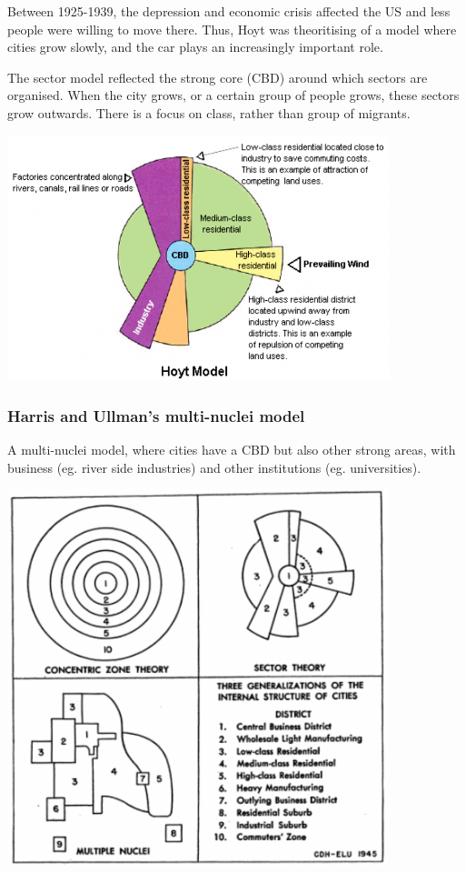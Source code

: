 \documentclass{article}
\begin{document}
Between 1925-1939, the depression and economic crisis affected the US and less people were willing to move there. Thus, Hoyt was theoritising of a model where cities grow slowly, and the car plays an increasingly important role.

The sector model reflected the strong core (CBD) around which sectors are organised. When the city grows, or a certain group of people grows, these sectors grow outwards. There is a focus on class, rather than group of migrants.

\begin{center}
\includegraphics[width=30em]{hoyt_model}
\end{center}

\subsubsection{Harris and Ullman's multi-nuclei model}

A multi-nuclei model, where cities have a CBD but also other strong areas, with business (eg. river side industries) and other institutions (eg. universities).

\begin{center}
\includegraphics[width=30em]{harris_ullman_model}
\end{center}
\end{document}
